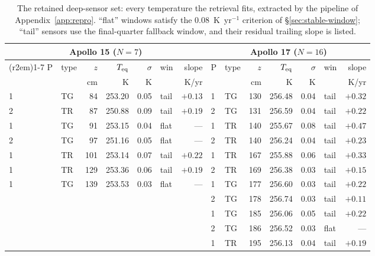 \documentclass[11pt,a4paper,oneside]{report}
\begin{document}
\begin{table}[htbp]
  \centering\footnotesize
  \setlength{\tabcolsep}{4.5pt}
  \caption[The retained deep-sensor set]{The retained deep-sensor set:
  every temperature the retrieval fits, extracted by the pipeline of
  Appendix~\ref{app:repro}. ``flat'' windows satisfy the
  $0.08$~K~yr$^{-1}$ criterion of \S\ref{sec:stable-window};
  ``tail'' sensors use the final-quarter fallback window, and their
  residual trailing slope is listed.}
  \label{tab:sensors}
  \begin{tabular}{llrrrlr@{\qquad}llrrrlr}
    \toprule
    \multicolumn{7}{c}{Apollo 15 ($N=7$)} &
    \multicolumn{7}{c}{Apollo 17 ($N=16$)} \\
    \cmidrule(r{2em}){1-7}\cmidrule{8-14}
    P & type & $z$ & $T_{\rm eq}$ & $\sigma$ & win & slope &
    P & type & $z$ & $T_{\rm eq}$ & $\sigma$ & win & slope \\
      &      & cm  & K            & K        &     & K/yr  &
      &      & cm  & K            & K        &     & K/yr  \\
    \midrule
    1 & TG & 84  & 253.20 & 0.05 & tail & $+0.13$ & 1 & TG & 130 & 256.48 & 0.04 & tail & $+0.32$ \\
    2 & TR & 87  & 250.88 & 0.09 & tail & $+0.19$ & 2 & TG & 131 & 256.59 & 0.04 & tail & $+0.22$ \\
    1 & TG & 91  & 253.15 & 0.04 & flat & ---     & 1 & TR & 140 & 255.67 & 0.08 & tail & $+0.47$ \\
    2 & TG & 97  & 251.16 & 0.05 & flat & ---     & 2 & TR & 140 & 256.24 & 0.04 & tail & $+0.23$ \\
    1 & TR & 101 & 253.14 & 0.07 & tail & $+0.22$ & 1 & TR & 167 & 255.88 & 0.06 & tail & $+0.33$ \\
    1 & TR & 129 & 253.36 & 0.06 & tail & $+0.19$ & 2 & TR & 169 & 256.38 & 0.03 & tail & $+0.15$ \\
    1 & TG & 139 & 253.53 & 0.03 & flat & ---     & 1 & TG & 177 & 256.60 & 0.03 & tail & $+0.22$ \\
      &    &     &        &      &      &         & 2 & TG & 178 & 256.74 & 0.03 & tail & $+0.11$ \\
      &    &     &        &      &      &         & 1 & TG & 185 & 256.06 & 0.05 & tail & $+0.22$ \\
      &    &     &        &      &      &         & 2 & TG & 186 & 256.52 & 0.03 & flat & ---     \\
      &    &     &        &      &      &         & 1 & TR & 195 & 256.13 & 0.04 & tail & $+0.19$ \\

\end{tabular}
\end{table}
\end{document}
